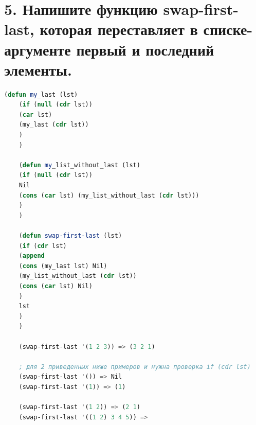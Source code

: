 \documentclass[12pt]{report}
\begin{document}
\section*{5. Напишите функцию swap-first-last, которая переставляет в списке-аргументе первый и последний элементы.}

\begin{lstlisting}[language=Lisp]
	(defun my_last (lst) 
	(if (null (cdr lst))
	(car lst)
	(my_last (cdr lst))
	)
	)
	
	(defun my_list_without_last (lst)
	(if (null (cdr lst))
	Nil
	(cons (car lst) (my_list_without_last (cdr lst)))
	)
	)
	
	(defun swap-first-last (lst)
	(if (cdr lst)
	(append 
	(cons (my_last lst) Nil)
	(my_list_without_last (cdr lst)) 
	(cons (car lst) Nil)	
	)
	lst
	)
	)
	
	(swap-first-last '(1 2 3)) => (3 2 1)
	
	; для 2 приведенных ниже примеров и нужна проверка if (cdr lst)
	(swap-first-last '()) => Nil
	(swap-first-last '(1)) => (1)
	
	(swap-first-last '(1 2)) => (2 1)
	(swap-first-last '((1 2) 3 4 5)) => 
\end{lstlisting}


	

	
\end{document}
